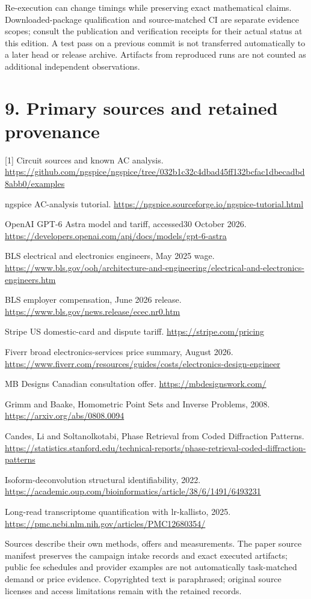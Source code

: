 \documentclass[10pt,letterpaper]{article}
\begin{document}
Re-execution can change timings while preserving exact mathematical claims. Downloaded-package qualification and source-matched CI are separate evidence scopes; consult the publication and verification receipts for their actual status at this edition. A test pass on a previous commit is not transferred automatically to a later head or release archive. Artifacts from reproduced runs are not counted as additional independent observations.\par
\section*{\color{accent}9. Primary sources and retained provenance}
[1] Circuit sources and known AC analysis. \url{https://github.com/ngspice/ngspice/tree/032b1c32c4dbad45ff132bcfac1dbecadbd8abb0/examples}\par
[2] ngspice AC-analysis tutorial. \url{https://ngspice.sourceforge.io/ngspice-tutorial.html}\par
[3] OpenAI GPT-6 Astra model and tariff, accessed30 October 2026. \url{https://developers.openai.com/api/docs/models/gpt-6-astra}\par
[4] BLS electrical and electronics engineers, May 2025 wage. \url{https://www.bls.gov/ooh/architecture-and-engineering/electrical-and-electronics-engineers.htm}\par
[5] BLS employer compensation, June 2026 release. \url{https://www.bls.gov/news.release/ecec.nr0.htm}\par
[6] Stripe US domestic-card and dispute tariff. \url{https://stripe.com/pricing}\par
[7] Fiverr broad electronics-services price summary, August 2026. \url{https://www.fiverr.com/resources/guides/costs/electronics-design-engineer}\par
[8] MB Designs Canadian consultation offer. \url{https://mbdesignswork.com/}\par
[9] Grimm and Baake, Homometric Point Sets and Inverse Problems, 2008. \url{https://arxiv.org/abs/0808.0094}\par
[10] Candes, Li and Soltanolkotabi, Phase Retrieval from Coded Diffraction Patterns. \url{https://statistics.stanford.edu/technical-reports/phase-retrieval-coded-diffraction-patterns}\par
[11] Isoform-deconvolution structural identifiability, 2022. \url{https://academic.oup.com/bioinformatics/article/38/6/1491/6493231}\par
[12] Long-read transcriptome quantification with lr-kallisto, 2025. \url{https://pmc.ncbi.nlm.nih.gov/articles/PMC12680354/}\par
Sources describe their own methods, offers and measurements. The paper source manifest preserves the campaign intake records and exact executed artifacts; public fee schedules and provider examples are not automatically task-matched demand or price evidence. Copyrighted text is paraphrased; original source licenses and access limitations remain with the retained records.\par
\end{document}
